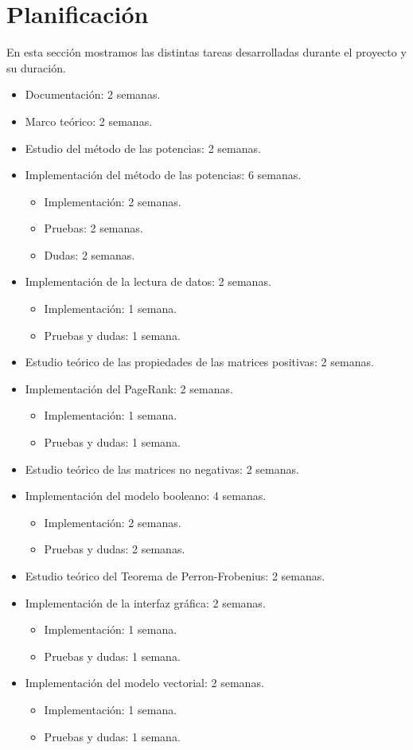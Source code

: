 \documentclass[size=a4, parskip=half, titlepage=false, toc=flat, toc=bib, 12pt, twoside]{scrartcl}
\theoremstyle{theorem-style}
\theoremstyle{definition-style}
\theoremstyle{remark-style}
\theoremstyle{example-style}
\theoremstyle{definition-style}
\theoremstyle{remark-style}
\begin{document}
\section{Planificación}
En esta sección mostramos las distintas tareas desarrolladas durante el proyecto y su duración.
\begin{itemize}
\item Documentación: 2 semanas.
\item Marco teórico: 2 semanas.
\item Estudio del método de las potencias: 2 semanas.
\item Implementación del método de las potencias: 6 semanas.
\begin{itemize}
\item Implementación: 2 semanas.
\item Pruebas: 2 semanas.
\item Dudas: 2 semanas.
\end{itemize}
\item Implementación de la lectura de datos: 2 semanas.
\begin{itemize}
\item Implementación: 1 semana.
\item Pruebas y dudas: 1 semana.
\end{itemize}
\item Estudio teórico de las propiedades de las matrices positivas: 2 semanas.
\item Implementación del PageRank: 2 semanas.
\begin{itemize}
\item Implementación: 1 semana.
\item Pruebas y dudas: 1 semana.
\end{itemize}
\item Estudio teórico de las matrices no negativas: 2 semanas.
\item Implementación del modelo booleano: 4 semanas.
\begin{itemize}
\item Implementación: 2 semanas.
\item Pruebas y dudas: 2 semanas.
\end{itemize}
\item Estudio teórico del Teorema de Perron-Frobenius: 2 semanas.
\item Implementación de la interfaz gráfica: 2 semanas.
\begin{itemize}
\item Implementación: 1 semana.
\item Pruebas y dudas: 1 semana.
\end{itemize}
\item Implementación del modelo vectorial: 2 semanas.
\begin{itemize}
\item Implementación: 1 semana.
\item Pruebas y dudas: 1 semana.
\end{itemize}
\end{itemize}
\end{document}
